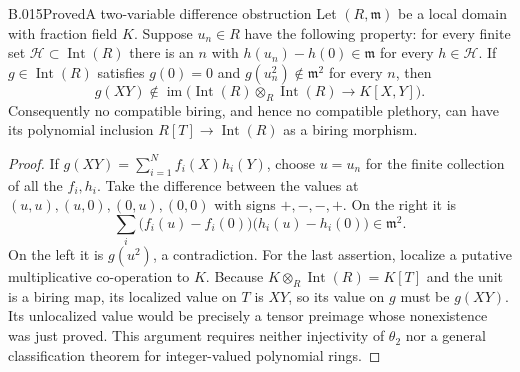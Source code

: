 \begin{saresult}{B.015}{Proved}{A two-variable difference obstruction}
Let $(R,\mathfrak m)$ be a local domain with fraction field $K$.
Suppose $u_n\in R$ have the following property: for every finite
set $\mathcal H\subset\operatorname{Int}(R)$ there is an $n$ with
$h(u_n)-h(0)\in\mathfrak m$ for every $h\in\mathcal H$.
If $g\in\operatorname{Int}(R)$ satisfies $g(0)=0$ and
$g(u_n^2)\notin\mathfrak m^2$ for every $n$, then
\[
 g(XY)\notin\operatorname{im}\bigl(
 \operatorname{Int}(R)\otimes_R\operatorname{Int}(R)
 \longrightarrow K[X,Y]\bigr).
\]
Consequently no compatible biring, and hence no compatible plethory,
can have its polynomial inclusion $R[T]\to\operatorname{Int}(R)$
as a biring morphism.
\end{saresult}
\begin{proof}
If $g(XY)=\sum_{i=1}^N f_i(X)h_i(Y)$, choose $u=u_n$ for the
finite collection of all the $f_i,h_i$. Take the difference between
the values at $(u,u),(u,0),(0,u),(0,0)$ with signs $+,-,-,+$.
On the right it is
\[
 \sum_i\bigl(f_i(u)-f_i(0)\bigr)
          \bigl(h_i(u)-h_i(0)\bigr)\in\mathfrak m^2.
\]
On the left it is $g(u^2)$, a contradiction. For the last assertion,
localize a putative multiplicative co-operation to $K$.
Because $K\otimes_R\operatorname{Int}(R)=K[T]$ and the unit is a
biring map, its localized value on $T$ is $XY$, so its value on
$g$ must be $g(XY)$. Its unlocalized value would be precisely a
tensor preimage whose nonexistence was just proved. This argument
requires neither injectivity of $\theta_2$ nor a general
classification theorem for integer-valued polynomial rings.
\end{proof}

